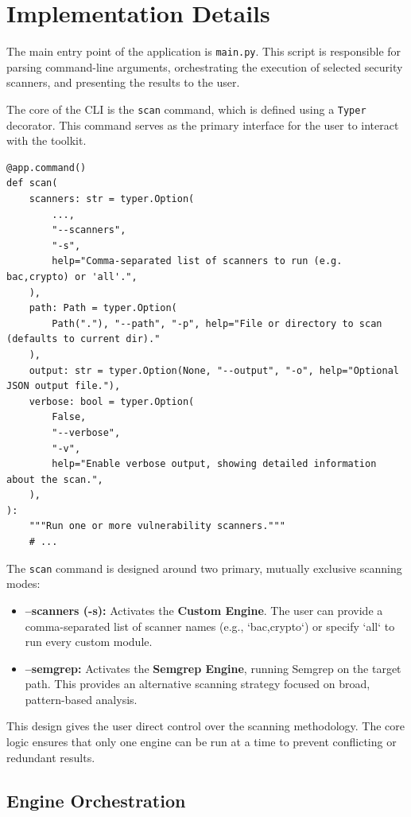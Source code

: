 \section{Implementation Details}

The main entry point of the application is \texttt{main.py}. This script is responsible for parsing command-line arguments, orchestrating the execution of selected security scanners, and presenting the results to the user.

The core of the CLI is the \texttt{scan} command, which is defined using a \texttt{Typer} decorator. This command serves as the primary interface for the user to interact with the toolkit.

\begin{verbatim}
@app.command()
def scan(
    scanners: str = typer.Option(
        ...,
        "--scanners",
        "-s",
        help="Comma-separated list of scanners to run (e.g. bac,crypto) or 'all'.",
    ),
    path: Path = typer.Option(
        Path("."), "--path", "-p", help="File or directory to scan (defaults to current dir)."
    ),
    output: str = typer.Option(None, "--output", "-o", help="Optional JSON output file."),
    verbose: bool = typer.Option(
        False,
        "--verbose",
        "-v",
        help="Enable verbose output, showing detailed information about the scan.",
    ),
):
    """Run one or more vulnerability scanners."""
    # ...
\end{verbatim}

The \texttt{scan} command is designed around two primary, mutually exclusive scanning modes:
\begin{itemize}
    \item \textbf{--scanners (-s):} Activates the \textbf{Custom Engine}. The user can provide a comma-separated list of scanner names (e.g., `bac,crypto`) or specify `all` to run every custom module.
    \item \textbf{--semgrep:} Activates the \textbf{Semgrep Engine}, running Semgrep on the target path. This provides an alternative scanning strategy focused on broad, pattern-based analysis.
\end{itemize}

This design gives the user direct control over the scanning methodology. The core logic ensures that only one engine can be run at a time to prevent conflicting or redundant results.

\subsection{Engine Orchestration}

